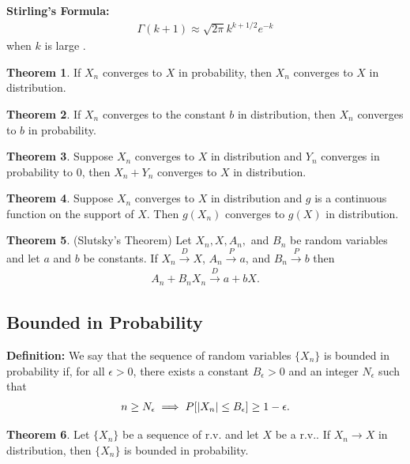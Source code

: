 \documentclass{book}
\theoremstyle{definition}
\newtheorem{thm}{Theorem}[section]
\begin{document}
\noindent \textbf{Stirling's Formula:}
\begin{align}
\Gamma(k+1) \approx \sqrt{2\pi} k^{k+1/2}e^{-k}
\end{align}
when $k$ is large . \\


\begin{thm} If $X_n$ converges to $X$ in probability, then $X_n$ converges to $X$ in distribution. 
\end{thm}


\begin{thm} If $X_n$ converges to the constant $b$ in distribution, then $X_n$ converges to $b$ in probability.
\end{thm}

\begin{thm} Suppose $X_n$ converges to $X$ in distribution and $Y_n$ converges in probability to 0, then $X_n + Y_n$ converges to $X$ in distribution. 
\end{thm}

\begin{thm} Suppose $X_n$ converges to $X$ in distribution and $g$ is a continuous function on the support of $X$. Then $g(X_n)$ converges to $g(X)$ in distribution. 
\end{thm}


\begin{thm} (Slutsky's Theorem) Let $X_n, X, A_n,$ and $B_n$ be random variables and let $a$ and $b$ be constants. If $X_n \xrightarrow{D} X$, $A_n \xrightarrow{P} a$, and $B_n \xrightarrow{P}b$ then
\begin{align}
A_n + B_nX_n \xrightarrow{D} a + bX.
\end{align}
\end{thm}




\subsection{Bounded in Probability}

\noindent \textbf{Definition:} We say that the sequence of random variables $\{X_n\}$ is bounded in probability if, for all $\epsilon > 0$, there exists a constant $B_\epsilon > 0$ and an integer $N_\epsilon$ such that
\begin{align}
n \geq N_\epsilon \implies P[\abs{X_n} \leq B_\epsilon] \geq 1 - \epsilon.
\end{align}




\begin{thm} Let $\{X_n\}$ be a sequence of r.v. and let $X$ be a r.v.. If $X_n \to X$ in distribution, then $\{ X_n\}$ is bounded in probability. 
\end{thm}
\end{document}

